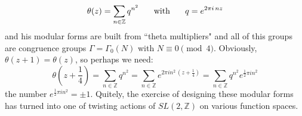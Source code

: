 \documentclass[12pt]{article}
\begin{document}
$$  \theta(z) = \sum_{n \in \mathbb{Z}} q^{n^2} \hspace{0.25in}\text{with}\hspace{0.25in} q = e^{2\pi i \, n z}$$
and his modular forms are built from ``theta multipliers" and all of this groups are congruence groups $\Gamma = \Gamma_0(N)$ with $N \equiv 0 \pmod 4$.  Obviously, $\theta(z+1) = \theta(z)$, so perhaps we need:
$$ \theta(z + \frac{1}{4}) = \sum_{n \in \mathbb{Z}} q^{n^2}
= \sum_{n \in \mathbb{Z}} e^{2\pi i n^2 \, (z + \frac{1}{4})} 
= \sum_{n \in \mathbb{Z}} q^{n^2}
e^{\frac{1}{2}\pi i n^2 } $$
the number $e^{\frac{1}{2}\pi i n^2 } = \pm 1$.  Quitely, the exercise of designing these modular forms has turned into one of twisting actions of $SL(2, \mathbb{Z})$ on various function spaces. 

\newpage
\end{document}
